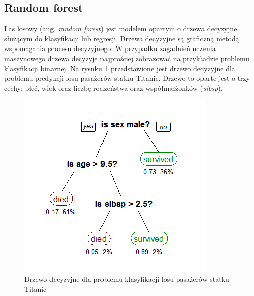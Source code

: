 \documentclass[a4paper, twoside, 11pt, openright]{article}
\begin{document}

\subsection{Random forest \cite{randforest}}

Las losowy (ang. \textit{random forest}) jest modelem opartym o drzewa decyzyjne służącym do klasyfikacji lub regresji. Drzewa decyzyjne są graficzną metodą wspomagania procesu decyzyjnego. W przypadku zagadnień uczenia maszynowego drzewa decyzyje najprościej zobrazować na przykładzie problemu klasyfikacji binarnej. Na rysnku \ref{wiki_dec_tree} przedstawione jest drzewo decyzyjne dla problemu predykcji losu pasażerów statku Titanic. Drzewo to oparte jest o trzy cechy: płeć, wiek oraz liczbę rodzeństwa oraz współmałżonków (\textit{sibsp}). 

\begin{figure}[H]
\centering \includegraphics[scale=0.6]{img/decision_tree.png}
\caption{Drzewo decyzyjne dla problemu klasyfikacji losu pasażerów statku Titanic \cite{wikidecisiontree}}
\label{wiki_dec_tree}
\end{figure}
\end{document}
